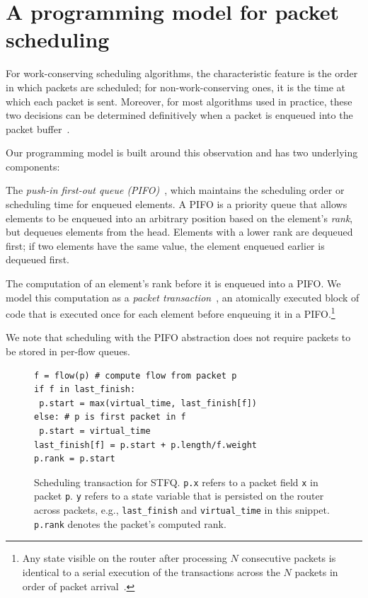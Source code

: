 \section{A programming model for packet scheduling}
\label{s:pifo}

For work-conserving scheduling algorithms, the characteristic feature
is the order in which packets are scheduled; for non-work-conserving
ones, it is the time at which each packet is sent. Moreover, for most
algorithms used in practice, these two decisions can be determined
definitively when a packet is enqueued into the packet
buffer~\cite{pifo_hotnets}.

Our programming model is built around this observation and has two
underlying components:
\begin{CompactEnumerate}
\item The {\em push-in first-out queue (PIFO)}~\cite{pifo}, which
  maintains the scheduling order or scheduling time for enqueued
  elements. A PIFO is a priority queue that allows elements to be
  enqueued into an arbitrary position based on the element's {\em
    rank}, but dequeues elements from the head. Elements with a lower
  rank are dequeued first; if two elements have the same value, the
  element enqueued earlier is dequeued first.

\item The computation of an element's rank before it is enqueued into
  a PIFO. We model this computation as a {\em packet
    transaction}~\cite{domino_sigcomm}, an atomically executed block
  of code that is executed once for each element before enqueuing it
  in a PIFO.\footnote{Any state visible on the router after processing
    $N$ consecutive packets is identical to a serial execution of the
    transactions across the $N$ packets in order of packet
    arrival~\cite{domino_sigcomm}.}
\end{CompactEnumerate}

We note that scheduling with the PIFO abstraction does not require packets to be
stored in per-flow queues.

\begin{figure}
\begin{lstlisting}[style=customc]
f = flow(p) # compute flow from packet p
if f in last_finish:
 p.start = max(virtual_time, last_finish[f])
else: # p is first packet in f
 p.start = virtual_time
last_finish[f] = p.start + p.length/f.weight
p.rank = p.start
\end{lstlisting}
\caption{Scheduling transaction for STFQ. {\tt p.x} refers to a packet
  field {\tt x} in packet {\tt p}.  {\tt y} refers to a state variable
  that is persisted on the router across packets, e.g., {\tt last\_finish}
  and {\tt virtual\_time} in this snippet. {\tt p.rank} denotes the
  packet's computed rank.}
\label{fig:sched_trans}
\end{figure}

